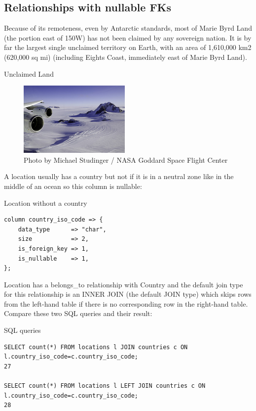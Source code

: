 \subsection{Relationships with nullable FKs}


Because of its remoteness, even by Antarctic standards, most of Marie Byrd
Land (the portion east of 150\degree{}W) has not been claimed by any sovereign
nation. It is by far the largest single unclaimed territory on Earth, with
an area of 1,610,000 km2 (620,000 sq mi) (including Eights Coast,
immediately east of Marie Byrd Land).

\begin{frame}{Unclaimed Land}
\begin{figure}
\includegraphics{img/Marie_Byrd_Land.jpg}
\caption[Marie Byrd Land]{Photo by Michael Studinger / NASA
  Goddard Space Flight Center}
\end{figure}
\end{frame}

A location usually has a country but not if it is in a neutral zone like in
the middle of an ocean so this column is nullable:

\begin{frame}[fragile]{Location without a country}
\begin{lstlisting}
column country_iso_code => {
    data_type      => "char",
    size           => 2,
    is_foreign_key => 1,
    is_nullable    => 1,
};
\end{lstlisting}
\end{frame}

Location has a belongs\_to relationship with Country and the default join
type for this relationship is an INNER JOIN (the default JOIN type) which
skips rows from the left-hand table if there is no corresponding row in the
right-hand table. Compare these two SQL queries and their result: 

\begin{frame}[fragile]{SQL queries}
\begin{lstlisting}
SELECT count(*) FROM locations l JOIN countries c ON l.country_iso_code=c.country_iso_code;
27

SELECT count(*) FROM locations l LEFT JOIN countries c ON l.country_iso_code=c.country_iso_code;
28
\end{lstlisting}
\end{frame}

